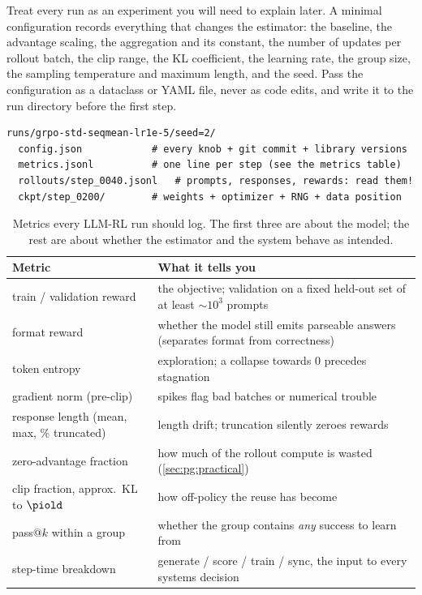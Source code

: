 Treat every run as an experiment you will need to explain later. A minimal configuration
records everything that changes the estimator: the baseline, the advantage scaling, the
aggregation and its constant, the number of updates per rollout batch, the clip range,
the KL coefficient, the learning rate, the group size, the sampling temperature and maximum
length, and the seed. Pass the configuration as a dataclass or YAML file, never as code edits,
and write it to the run directory before the first step.

\begin{lstlisting}[style=plain,caption={A run directory that makes RL experiments reproducible and comparable.},label={lst:pg:rundir}]
runs/grpo-std-seqmean-lr1e-5/seed=2/
  config.json            # every knob + git commit + library versions
  metrics.jsonl          # one line per step (see the metrics table)
  rollouts/step_0040.jsonl   # prompts, responses, rewards: read them!
  ckpt/step_0200/        # weights + optimizer + RNG + data position
\end{lstlisting}

\begin{table}[ht]
\centering\small
\begin{tabularx}{\linewidth}{@{}lX@{}}
\toprule
Metric & What it tells you\\
\midrule
train / validation reward & the objective; validation on a fixed held-out set of at least $\sim10^3$ prompts\\
format reward & whether the model still emits parseable answers (separates format from correctness)\\
token entropy & exploration; a collapse towards 0 precedes stagnation\\
gradient norm (pre-clip) & spikes flag bad batches or numerical trouble\\
response length (mean, max, \% truncated) & length drift; truncation silently zeroes rewards\\
zero-advantage fraction & how much of the rollout compute is wasted (\cref{sec:pg:practical})\\
clip fraction, approx.\ KL to $\piold$ & how off-policy the reuse has become\\
pass@$k$ within a group & whether the group contains \emph{any} success to learn from\\
step-time breakdown & generate / score / train / sync, the input to every systems decision\\
\bottomrule
\end{tabularx}
\caption{Metrics every LLM-RL run should log. The first three are about the model; the rest are
about whether the estimator and the system behave as intended.}
\label{tab:pg:metrics}
\end{table}

